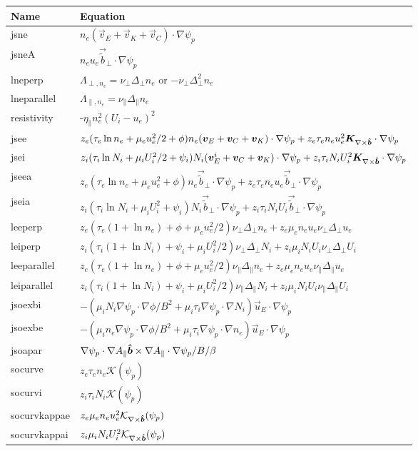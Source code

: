 \begin{longtable}{ll}
\toprule
\rowcolor{gray!50}\textbf{Name} &  \textbf{Equation}\\
\midrule
    jsne &$ n_e (\vec v_E + \vec v_K + \vec v_C )\cdot\nabla \psi_p$ \\
    jsneA &$ n_e u_e \vec{\tilde b}_\perp  \cdot\nabla \psi_p$ \\
    lneperp &$ \Lambda_{\perp,n_e} = \nu_\perp \Delta_\perp n_e$ or $-\nu_\perp \Delta^2_\perp n_e$ \\
    lneparallel &$ \Lambda_{\parallel,n_e} = \nu_\parallel \Delta_\parallel n_e$ \\
    resistivity &-$\eta_\parallel n_e^2 (U_i-u_e)^2$ \\
    jsee &$z_e(\tau_e \ln n_e + \mu_e u_e^2/2 + \phi)n_e({\boldsymbol{v}}_E + {\boldsymbol{v}}_C + {\boldsymbol{v}}_K)\cdot\nabla \psi_p
        + z_e \tau_e n_e u_e^2 {\boldsymbol{K}}_{\nabla\times\bm{\hat{b}}}\cdot\nabla \psi_p$ \\
    jsei &$z_i(\tau_i \ln N_i + \mu_i U_i^2/2 + \psi_i)N_i({\boldsymbol{v}}_E^i + {\boldsymbol{v}}_C + {\boldsymbol{v}}_K)\cdot\nabla \psi_p
        + z_i \tau_i N_i U_i^2 {\boldsymbol{K}}_{\nabla\times\bm{\hat{b}}}\cdot\nabla \psi_p$ \\
    jseea &$z_e(\tau_e \ln n_e + \mu_e u_e^2 + \phi)n_e \vec {\tilde b}_\perp\cdot\nabla \psi_p
        + z_e \tau_e n_e u_e \vec{\tilde b}_\perp \cdot \nabla \psi_p $ \\
    jseia &$z_i(\tau_i \ln N_i + \mu_i U_i^2 + \psi_i)N_i \vec {\tilde b}_\perp\cdot\nabla \psi_p
        + z_i \tau_i N_i U_i \vec{\tilde b}_\perp \cdot \nabla \psi_p $ \\
    leeperp &$z_e(\tau_e(1+\ln n_e) + \phi + \mu_eu_e^2/2) \nu_\perp \Delta_\perp n_e + z_e\mu_e n_e u_e \nu_\perp \Delta_\perp u_e$ \\
    leiperp &$z_i(\tau_i(1+\ln N_i) + \psi_i + \mu_iU_i^2/2) \nu_\perp \Delta_\perp N_i + z_i\mu_i N_i U_i \nu_\perp \Delta_\perp U_i$ \\
    leeparallel &$z_e(\tau_e(1+\ln n_e) + \phi + \mu_eu_e^2/2) \nu_\parallel \Delta_\parallel n_e + z_e\mu_e n_e u_e \nu_\parallel \Delta_\parallel u_e$ \\
    leiparallel &$z_i(\tau_i(1+\ln N_i) + \psi_i + \mu_iU_i^2/2) \nu_\parallel \Delta_\parallel N_i + z_i\mu_i N_i U_i \nu_\parallel \Delta_\parallel U_i$ \\
    jsoexbi &$-(\mu_i N_i \nabla\psi_p\cdot\nabla\phi/B^2+\mu_i \tau_i\nabla\psi_p\cdot\nabla N_i)  \vec u_E\cdot\nabla \psi_p$ \\
    jsoexbe &$-(\mu_i n_e \nabla\psi_p\cdot\nabla\phi/B^2+\mu_i \tau_i\nabla\psi_p\cdot\nabla n_e) \vec u_E\cdot\nabla \psi_p$ \\
    jsoapar &$ \nabla\psi_p\cdot\nabla A_\parallel \bm{\hat{b}}\times\nabla A_\parallel\cdot\nabla \psi_p/B/\beta$ \\
    socurve &$z_e\tau_e n_e \mathcal K(\psi_p)$ \\
    socurvi &$z_i\tau_i N_i \mathcal K(\psi_p)$ \\
    socurvkappae &$z_e\mu_e n_eu_e^2 \mathcal K_{\nabla\times\bm{\hat{b}}}(\psi_p)$ \\
    socurvkappai &$z_i\mu_i N_iU_i^2 \mathcal K_{\nabla\times\bm{\hat{b}}}(\psi_p)$ \\
\bottomrule
\end{longtable}
